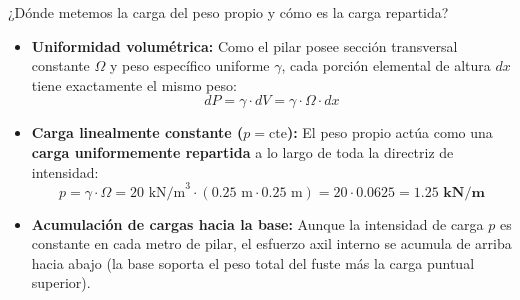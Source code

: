 \begin{question}{¿Dónde metemos la carga del peso propio y cómo es la carga repartida?}{}
    \begin{itemize}
        \item \textbf{Uniformidad volumétrica:} Como el pilar posee sección transversal constante $\Omega$ y peso específico uniforme $\gamma$, cada porción elemental de altura $dx$ tiene exactamente el mismo peso:
              \begin{equation}
                  dP = \gamma \cdot dV = \gamma \cdot \Omega \cdot dx
              \end{equation}
        \item \textbf{Carga linealmente constante ($p = \text{cte}$):} El peso propio actúa como una \textbf{carga uniformemente repartida} a lo largo de toda la directriz de intensidad:
              \begin{equation}
                  p = \gamma \cdot \Omega = 20\text{ kN/m}^3 \cdot (0.25\text{ m} \cdot 0.25\text{ m}) = 20 \cdot 0.0625 = \mathbf{1.25\text{ kN/m}}
              \end{equation}
        \item \textbf{Acumulación de cargas hacia la base:} Aunque la intensidad de carga $p$ es constante en cada metro de pilar, el esfuerzo axil interno se acumula de arriba hacia abajo (la base soporta el peso total del fuste más la carga puntual superior).
    \end{itemize}
\end{question}

